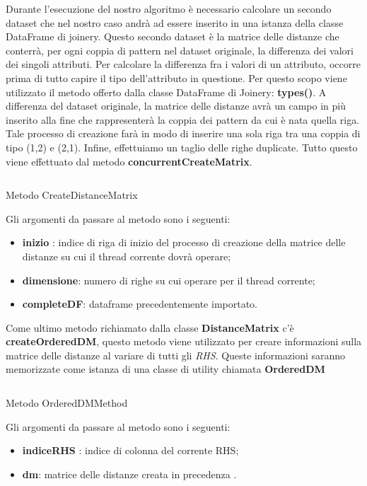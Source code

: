 Durante l'esecuzione del nostro algoritmo è necessario calcolare un secondo dataset che nel nostro caso andrà ad essere inserito in una istanza della classe DataFrame di joinery.
Questo secondo dataset è la matrice delle distanze che conterrà, per ogni coppia di pattern nel dataset originale, la differenza dei valori dei singoli attributi.
Per calcolare la differenza fra i valori di un attributo, occorre prima di tutto capire il tipo dell'attributo in questione. Per questo scopo viene utilizzato il metodo offerto dalla classe DataFrame di Joinery: \textbf{types()}.
A differenza del dataset originale, la matrice delle distanze avrà un campo in più inserito alla fine che rappresenterà la coppia dei pattern da cui è nata quella riga.
Tale processo di creazione farà in modo di inserire una sola riga tra una coppia di tipo (1,2) e (2,1).
Infine, effettuiamo un taglio delle righe duplicate.
Tutto questo viene effettuato dal metodo \textbf{concurrentCreateMatrix}.
\begin{listing}[H]
	\inputminted[]{java}{Codici/CreateDistanceMatrix.java}
	\caption{Metodo CreateDistanceMatrix}
	\label{Code:2}
\end{listing}
Gli argomenti da passare al metodo sono i seguenti:
\begin{itemize}
	\item \textbf{inizio} : indice di riga di inizio del processo di creazione della matrice delle distanze su cui il thread corrente dovrà operare;
	\item \textbf{dimensione}: numero di righe su cui operare per il thread corrente;
	\item \textbf{completeDF}: dataframe precedentemente importato.
\end{itemize}
Come ultimo metodo richiamato dalla classe \textbf{DistanceMatrix} c'è \textbf{createOrderedDM}, questo metodo viene utilizzato per creare informazioni sulla matrice delle distanze al variare di tutti gli \emph{RHS}.
Queste informazioni saranno memorizzate come istanza di una classe di utility chiamata \textbf{OrderedDM}
\begin{listing}[H]
	\inputminted[]{java}{Codici/OrderedDMMethod.java}
	\caption{Metodo OrderedDMMethod}
	\label{Code:3}
\end{listing}
Gli argomenti da passare al metodo sono i seguenti:
\begin{itemize}
	\item \textbf{indiceRHS} : indice di colonna del corrente RHS;
	\item \textbf{dm}: matrice delle distanze creata in precedenza .
\end{itemize}
